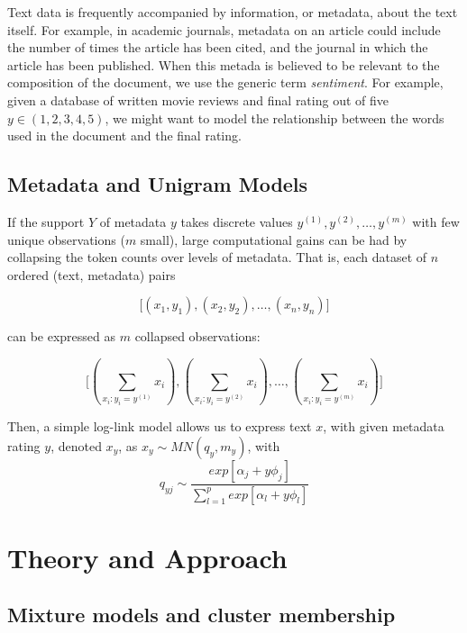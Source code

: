 \documentclass[12pt]{article}
\begin{document}
Text data is frequently accompanied by information, or metadata, about
the text itself. For example, in academic journals, metadata on an
article could include the number of times the article has been cited,
and the journal in which the article has been published. When this
metada is believed to be relevant to the composition of the document, we
use the generic term \emph{sentiment}. For example, given a database of
written movie reviews and final rating out of five $y \in (1,2,3,4,5)$,
we might want to model the relationship between the words used in the
document and the final rating.

\subsection{Metadata and Unigram Models}

If the support $Y$ of metadata $y$ takes discrete values $y^{(1)}, y^{(2)}, \dots, y^{(m)}$ with few unique observations ($m$ small), large computational gains can be had by collapsing the token counts over levels of metadata.  That is, each dataset of $n$ ordered (text, metadata) pairs

\begin{equation}
\big[ (x_1,y_1), (x_2,y_2), \dots , (x_n,y_n) \big]
\end{equation}

can be expressed as $m$ collapsed observations:

\begin{equation}
\big[  (\sum_{x_i : y_i = y^{(1)}}{x_i}) , (\sum_{x_i : y_i = y^{(2)}}{x_i}), \dots,  (\sum_{x_i : y_i = y^{(m)}}{x_i})  \big]
\end{equation}

Then, a simple log-link model allows us to express text $x$, with given metadata rating $y$,
denoted $x_y$, as $x_y \sim MN(q_y,m_y)$, with
\begin{equation}
q_{yj} \sim \frac{exp[\alpha_j + y \phi_j]}{\sum_{l=1}^{p} exp[\alpha_l + y \phi_l]}
\end{equation}

\section{Theory and Approach}\label{theory-and-approach}

\subsection{Mixture models and cluster
membership}\label{mixture-models-and-cluster-membership}
\end{document}
